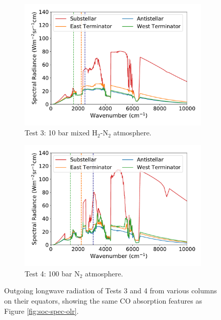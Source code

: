 \begin{figure}
  \centering
  \begin{subfigure}[t]{0.49\textwidth}
    \includegraphics[width=\textwidth]{figures/soc-lava-planets/h2n2-spec-olr.pdf}
    \caption{Test 3: 10 bar mixed H$_{2}$-N$_{2}$ atmosphere.}\label{fig:soc-spec-olr-h2n2}
  \end{subfigure}
  \begin{subfigure}[t]{0.49\textwidth}
    \includegraphics[width=\textwidth]{figures/soc-lava-planets/n2-100bar-spec-olr.pdf}
    \caption{Test 4: 100 bar N$_{2}$ atmosphere.}\label{fig:soc-spec-olr-n2-100bar}
  \end{subfigure}
  \caption{Outgoing longwave radiation of Tests 3 and 4 from various columns on their equators, showing the same CO absorption features as Figure \ref{fig:soc-spec-olr}.}
  \label{fig:soc-olr-best}
\end{figure}

